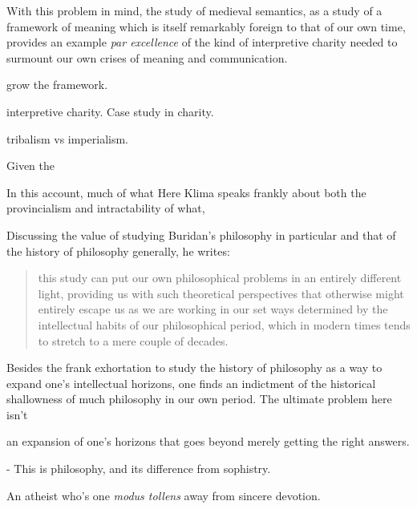 \documentclass[]{article}
\begin{document}
With this problem in mind, the study of medieval semantics, 
as a study of a framework of meaning which is itself remarkably foreign to that of our own time, 
provides an example \emph{par excellence} of the kind of interpretive charity needed to surmount our own crises of meaning and communication. 


grow the framework.

interpretive charity.
Case study in charity. 

tribalism vs imperialism.

Given the 

In this account, much of what 
Here Klima speaks frankly about both the provincialism and intractability of what, 

Discussing the value of studying Buridan's philosophy in particular and that of the history of philosophy generally, he writes: 

\begin{quote}
	this study can put our own philosophical problems in an entirely different light, providing us with
	such theoretical perspectives that otherwise might entirely escape us as we are working in our
	set ways determined by the intellectual habits of our philosophical period, which in modern
	times tends to stretch to a mere couple of decades. \autocite[17]{Klima2005}
\end{quote}
Besides the frank exhortation to study the history of philosophy as a way to expand one's intellectual horizons, 
one finds an indictment of the historical shallowness of much philosophy in our own period. 
The ultimate problem here isn't 


an expansion of one's horizons that goes beyond merely getting the right answers.

- This is philosophy, and its difference from sophistry.

An atheist who's one \emph{modus tollens} away from sincere devotion.
\end{document}
